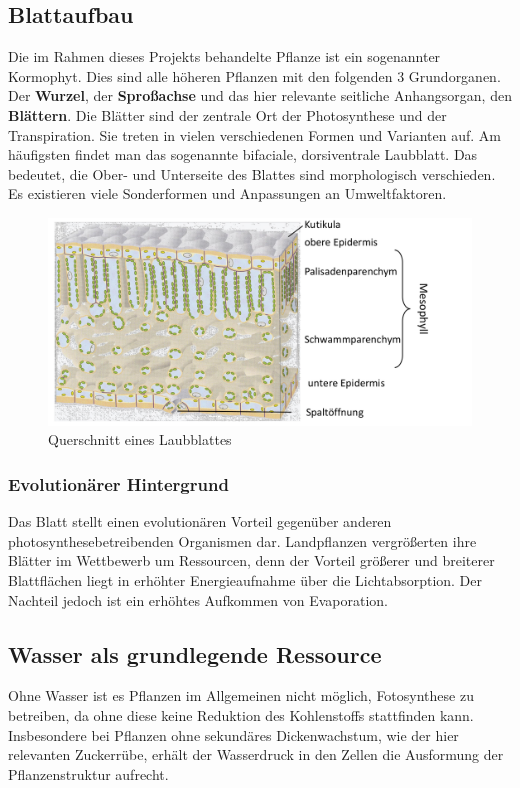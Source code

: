 \subsection{Blattaufbau}
Die im Rahmen dieses Projekts behandelte Pflanze ist ein sogenannter Kormophyt. Dies sind alle höheren Pflanzen mit den folgenden 3 Grundorganen. Der \textbf{Wurzel}, der \textbf{Sproßachse} und das hier relevante seitliche Anhangsorgan, den \textbf{Blättern}. Die Blätter sind der zentrale Ort der Photosynthese und der Transpiration. Sie treten in vielen verschiedenen Formen und Varianten auf. Am häufigsten findet man das sogenannte bifaciale, dorsiventrale Laubblatt. Das bedeutet, die Ober- und Unterseite des Blattes sind morphologisch verschieden. Es existieren viele Sonderformen und Anpassungen an Umweltfaktoren.
\begin{figure}
    \centering
    \includegraphics[width=0.7\linewidth]{Bildschirmfoto vom 2025-03-30 19-59-09.png}
    \caption{Querschnitt eines Laubblattes}
    \label{fig:enter-label}
\end{figure}
\subsubsection{Evolutionärer Hintergrund}
Das Blatt stellt einen evolutionären Vorteil gegenüber anderen photosynthesebetreibenden Organismen dar. Landpflanzen vergrößerten ihre Blätter im Wettbewerb um Ressourcen, denn der Vorteil größerer und breiterer Blattflächen liegt in erhöhter Energieaufnahme über die Lichtabsorption. Der Nachteil jedoch ist ein erhöhtes Aufkommen von Evaporation.
\subsection{Wasser als grundlegende Ressource}
Ohne Wasser ist es Pflanzen im Allgemeinen nicht möglich, Fotosynthese zu betreiben, da ohne diese keine Reduktion des Kohlenstoffs stattfinden kann. Insbesondere bei Pflanzen ohne sekundäres Dickenwachstum, wie der hier relevanten Zuckerrübe, erhält der Wasserdruck in den Zellen die Ausformung der Pflanzenstruktur aufrecht. \cite{oeko}
